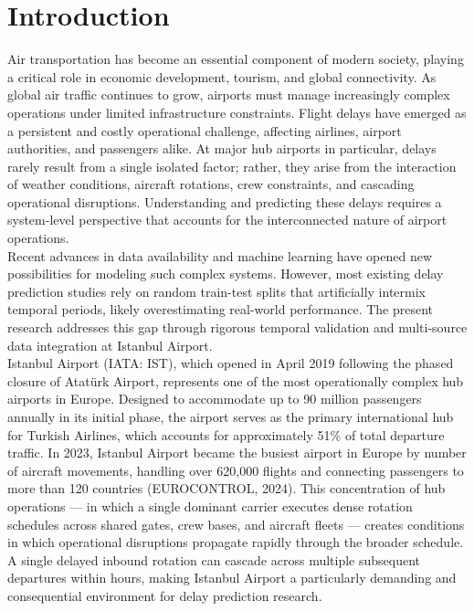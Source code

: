 \documentclass{report}
\begin{document}
\newpage

\tableofcontents
\listoftables
\listoffigures

\clearpage
{}

\chapter{Introduction}


Air transportation has become an essential component of modern society, playing a critical role in economic development, tourism, and global connectivity. As global air traffic continues to grow, airports must manage increasingly complex operations under limited infrastructure constraints. Flight delays have emerged as a persistent and costly operational challenge, affecting airlines, airport authorities, and passengers alike. At major hub airports in particular, delays rarely result from a single isolated factor; rather, they arise from the interaction of weather conditions, aircraft rotations, crew constraints, and cascading operational disruptions. Understanding and predicting these delays requires a system-level perspective that accounts for the interconnected nature of airport operations. \\

Recent advances in data availability and machine learning have opened new possibilities for modeling such complex systems. However, most existing delay prediction studies rely on random train-test splits that artificially intermix temporal periods, likely overestimating real-world performance. The present research addresses this gap through rigorous temporal validation and multi-source data integration at Istanbul Airport. \\

Istanbul Airport (IATA: IST), which opened in April 2019 following the phased 
closure of Atatürk Airport, represents one of the most operationally complex hub 
airports in Europe. Designed to accommodate up to 90 million passengers annually 
in its initial phase, the airport serves as the primary international hub for 
Turkish Airlines, which accounts for approximately 51\% of total departure traffic. 
In 2023, Istanbul Airport became the busiest airport in Europe by number of aircraft 
movements, handling over 620,000 flights and connecting passengers to more than 120 
countries (EUROCONTROL, 2024). This concentration of hub operations --- in which a 
single dominant carrier executes dense rotation schedules across shared gates, crew 
bases, and aircraft fleets --- creates conditions in which operational disruptions 
propagate rapidly through the broader schedule. A single delayed inbound rotation 
can cascade across multiple subsequent departures within hours, making Istanbul 
Airport a particularly demanding and consequential environment for delay prediction 
research.
\end{document}
